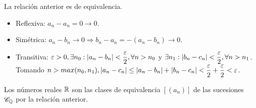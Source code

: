 \clearpage

\begin{prop}
  La relación anterior es de equivalencia. \begin{itemize}
    \item Reflexiva: \(a_n - a_n = 0 \to 0\).
    \item Simétrica: \(a_n - b_n \to 0 \Rightarrow b_n - a_n = -(a_n-b_n) \to 0\).
    \item Transitiva: \(\varepsilon > 0, \exists n_0 : |a_n - b_n| < \dfrac{\varepsilon}{2}, \forall n > n_0\)
          y \(\exists n_1 : |b_n - c_n| < \dfrac{\varepsilon}{2}, \forall n > n_1\). Tomando \(n > max(n_0, n_1), |a_n - c_n| \leq |a_n - b_n| + |b_n - c_n| < \dfrac{\varepsilon}{2} + \dfrac{\varepsilon}{2} < \varepsilon\).
  \end{itemize}
\end{prop}

\begin{definition}
  Los números reales \(\mathbb{R}\) son las clases de equivalencia \([(a_n)]\) de las sucesiones \(\mathscr{C}_{\mathbb{Q}}\) por la relación anterior.
\end{definition}
